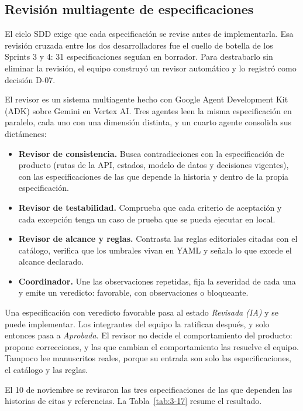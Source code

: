 \subsection{Revisión multiagente de especificaciones}\label{sec:revision-multiagente}

El ciclo SDD exige que cada especificación se revise antes de implementarla. Esa revisión cruzada entre los dos desarrolladores fue el cuello de botella de los Sprints 3 y 4: 31 especificaciones seguían en borrador. Para destrabarlo sin eliminar la revisión, el equipo construyó un revisor automático y lo registró como decisión D-07.

El revisor es un sistema multiagente hecho con Google Agent Development Kit (ADK) sobre Gemini en Vertex AI. Tres agentes leen la misma especificación en paralelo, cada uno con una dimensión distinta, y un cuarto agente consolida sus dictámenes:

\begin{itemize}
  \item \textbf{Revisor de consistencia.} Busca contradicciones con la especificación de producto (rutas de la API, estados, modelo de datos y decisiones vigentes), con las especificaciones de las que depende la historia y dentro de la propia especificación.
  \item \textbf{Revisor de testabilidad.} Comprueba que cada criterio de aceptación y cada excepción tenga un caso de prueba que se pueda ejecutar en local.
  \item \textbf{Revisor de alcance y reglas.} Contrasta las reglas editoriales citadas con el catálogo, verifica que los umbrales vivan en YAML y señala lo que excede el alcance declarado.
  \item \textbf{Coordinador.} Une las observaciones repetidas, fija la severidad de cada una y emite un veredicto: favorable, con observaciones o bloqueante.
\end{itemize}

Una especificación con veredicto favorable pasa al estado \emph{Revisada (IA)} y se puede implementar. Los integrantes del equipo la ratifican después, y solo entonces pasa a \emph{Aprobada}. El revisor no decide el comportamiento del producto: propone correcciones, y las que cambian el comportamiento las resuelve el equipo. Tampoco lee manuscritos reales, porque su entrada son solo las especificaciones, el catálogo y las reglas.

El 10 de noviembre se revisaron las tres especificaciones de las que dependen las historias de citas y referencias. La Tabla~\ref{tab:3-17} resume el resultado.

